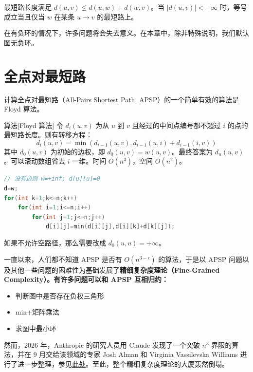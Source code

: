 \begin{property}[三角不等式]
    最短路长度满足 $d(u,v)\le d(u,w)+d(w,v)$。当 $|d(u,v)|<+\infty$ 时，等号成立当且仅当 $w$ 在某条 $u\to v$ 的最短路上。
\end{property}



在有负环的情况下，许多问题将会失去意义。在本章中，除非特殊说明，我们默认图无负环。



\section{全点对最短路}

计算全点对最短路（All-Pairs Shortest Path, APSP）的一个简单有效的算法是 Floyd 算法。

\begin{descbox}{算法}[Floyd 算法]
    令 $d_i(u,v)$ 为从 $u$ 到 $v$ 且经过的中间点编号都不超过 $i$ 的点的最短路长度。则有转移方程：
    \[
        d_i(u,v)=\min(d_{i-1}(u,v),d_{i-1}(u,i)+d_{i-1}(i,v))
    \]
    其中 $d_0(u,v)$ 为初始的边权，即 $d_0(u,v)=w(u,v)$。最终答案为 $d_n(u,v)$。可以滚动数组省去 $i$ 一维。时间 $O(n^3)$，空间 $O(n^2)$。  
\end{descbox}
\begin{lstlisting}[language=c++, caption=Floyd 算法]
// 没有边则 w=+inf; d[u][u]=0
d=w;
for(int k=1;k<=n;k++)
    for(int i=1;i<=n;i++)
        for(int j=1;j<=n;j++)
            d[i][j]=min(d[i][j],d[i][k]+d[k][j]);
\end{lstlisting}
\begin{remark}
    如果不允许空路径，那么需要改成 $d_0(u,u)=+\infty$。
\end{remark}
\begin{remark}
    一直以来，人们都不知道 APSP 是否有 $O(n^{3-\epsilon})$ 的算法，于是以 APSP 问题以及其他一些问题的困难性为基础发展了\bf{精细复杂度理论（Fine-Grained Complexity）}。有许多问题可以和 APSP 互相归约：
    \begin{itemize}
        \item 判断图中是否存在负权三角形
        \item min+矩阵乘法
        \item 求图中最小环
    \end{itemize}
    然而，2026 年，Anthropic 的研究人员用 Claude 发现了一个突破 $n^3$ 界限的算法，并在 9 月交给该领域的专家 Josh Alman 和 Virginia Vassilevska Williams 进行了进一步整理，参见\href{https://arxiv.org/abs/2610.06783v1}{此处}。至此，整个精细复杂度理论的大厦轰然倒塌。
\end{remark}

